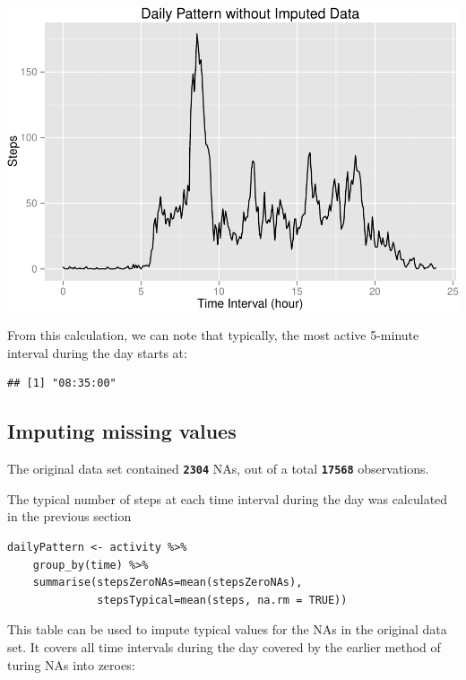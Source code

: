 \documentclass[]{article}
\newenvironment{Shaded}{\begin{snugshade}}{\end{snugshade}}
\newcommand{\KeywordTok}[1]{\textcolor[rgb]{0.13,0.29,0.53}{\textbf{{#1}}}}
\newcommand{\NormalTok}[1]{{#1}}
\begin{document}
\includegraphics{PA1_template_files/figure-latex/unnamed-chunk-2-1.pdf}

From this calculation, we can note that typically, the most active
5-minute interval during the day starts at:

\begin{Shaded}
\end{Shaded}

\begin{verbatim}
## [1] "08:35:00"
\end{verbatim}

\subsection{Imputing missing values}\label{imputing-missing-values}

The original data set contained \textbf{\texttt{2304}} NAs, out of a
total \textbf{\texttt{17568}} observations.

The typical number of steps at each time interval during the day was
calculated in the previous section

\begin{verbatim}
dailyPattern <- activity %>%
    group_by(time) %>% 
    summarise(stepsZeroNAs=mean(stepsZeroNAs), 
              stepsTypical=mean(steps, na.rm = TRUE))
\end{verbatim}

This table can be used to impute typical values for the NAs in the
original data set. It covers all time intervals during the day covered
by the earlier method of turing NAs into zeroes:
\end{document}
